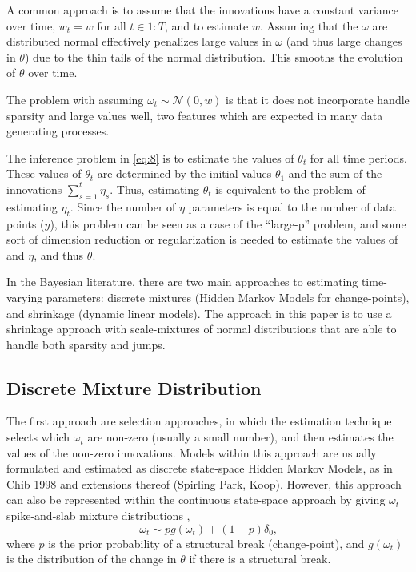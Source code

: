 \documentclass{article}
\newcommand{\paren}[1]{\ensuremath{\left(#1\right)}}
\newcommand{\dnorm}[1]{\ensuremath{\mathcal{N}\paren{#1}}}
\begin{document}
A common approach is to assume that the innovations have a constant variance over time, $w_{t} = w$  for all $t \in 1:T$, and to estimate $w$.
Assuming that the $\omega$ are distributed normal effectively penalizes large values in $\omega$ (and thus large changes in $\theta$) due to the thin tails of the normal distribution. 
This smooths the evolution of $\theta$ over time. 

The problem with assuming $\omega_{t} \sim \dnorm{0, w}$ is that it does not incorporate handle sparsity and large values well, two features which are expected in many data generating processes.

The inference problem in \eqref{eq:8} is to estimate the values of $\theta_{t}$ for all time periods.
These values of $\theta_{t}$ are determined by the initial values $\theta_{1}$ and the sum of the innovations $\sum_{s=1}^{t} \eta_{s}$.
Thus, estimating $\theta_{t}$ is equivalent to the problem of estimating $\eta_{t}$.
Since the number of $\eta$ parameters is equal to the number of data points ($y$), this problem can be seen as a case of the ``large-p'' problem, and some sort of dimension reduction or regularization is needed to estimate the values of and $\eta$, and thus $\theta$.

In the Bayesian literature, there are two main approaches to estimating time-varying parameters: discrete mixtures (Hidden Markov Models for change-points), and shrinkage (dynamic linear models).
The approach in this paper is to use a shrinkage approach with scale-mixtures of normal distributions that are able to handle both sparsity and jumps.

\subsection{Discrete Mixture Distribution}
\label{sec:discr-mixt-distr}

The first approach are selection approaches, in which the estimation technique selects which $\omega_{t}$ are non-zero (usually a small number), and then estimates the values of the non-zero innovations.
Models within this approach are usually formulated and estimated as discrete state-space Hidden Markov Models, as in Chib 1998 and extensions thereof (Spirling Park, Koop).
However, this approach can also be represented within the continuous state-space approach by giving $\omega_{t}$ spike-and-slab mixture distributions \parencite{GiordaniKohn2008},
\begin{equation}
  \label{eq:1}
  \omega_{t} \sim p g(\omega_{t}) + (1 - p) \delta_{0} \text{,}
\end{equation}
where $p$ is the prior probability of a structural break (change-point), and $g(\omega_{t})$ is the distribution of the change in $\theta$ if there is a structural break.
\end{document}
